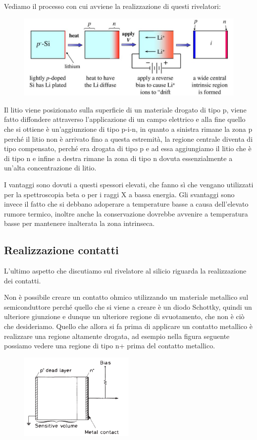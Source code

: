 Vediamo il processo con cui avviene la realizzazione di questi rivelatori:
\begin{figure}[H]
   \centering
   \includegraphics[width=\textwidth]{immagini/rivelatore_a_deriva_di_litio.png}
\end{figure}
Il litio viene posizionato sulla superficie di un materiale drogato di tipo p, viene fatto diffondere attraverso l'applicazione di un campo elettrico e alla fine quello che si ottiene è un'aggiunzione di tipo p-i-n, in quanto a sinistra rimane la zona p perché il litio non è arrivato fino a questa estremità, la regione centrale diventa di tipo compensato, perché era drogata di tipo p e ad essa aggiungiamo il litio che è di tipo n e infine a destra rimane la zona di tipo n dovuta essenzialmente a un'alta concentrazione di litio.

I vantaggi sono dovuti a questi spessori elevati, che fanno sì che vengano utilizzati per la spettroscopia beta o per i raggi X a bassa energia. Gli svantaggi sono invece il fatto che si debbano adoperare a temperature basse a causa dell'elevato rumore termico, inoltre anche la conservazione dovrebbe avvenire a temperatura basse per mantenere inalterata la zona intrinseca.

\subsection{Realizzazione contatti}
L'ultimo aspetto che discutiamo sul rivelatore al silicio riguarda la realizzazione dei contatti. 

Non è possibile creare un contatto ohmico utilizzando un materiale metallico sul semiconduttore perché quello che si viene a creare è un diodo Schottky, quindi un ulteriore giunzione e dunque un ulteriore regione di svuotamento, che non è ciò che desideriamo. Quello che allora si fa prima di applicare un contatto metallico è realizzare una regione altamente drogata, ad esempio nella figura seguente possiamo vedere una regione di tipo n+ prima del contatto metallico.
\begin{figure}[H]
   \centering
   \includegraphics[width=0.5\textwidth]{immagini/realizzazione_contatti.png}
\end{figure}

